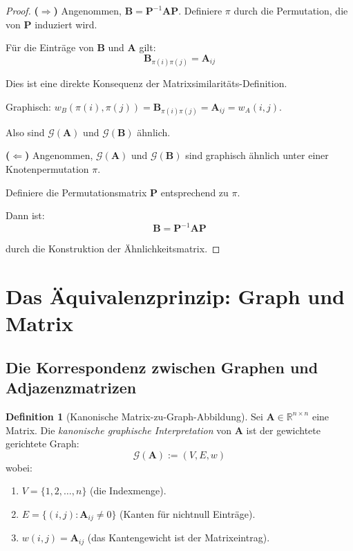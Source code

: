 \documentclass[12pt, a4paper]{article}
\theoremstyle{definition}
\newtheorem{definition}[theorem]{Definition}
\theoremstyle{remark}
\newcommand{\R}{\mathbb{R}}
\newcommand{\vA}{\bm{A}}
\newcommand{\vB}{\bm{B}}
\newcommand{\vP}{\bm{P}}
\newcommand{\Graph}{\mathcal{G}}
\begin{document}
\begin{proof}
\textbf{($\Rightarrow$)} Angenommen, $\vB = \vP^{-1} \vA \vP$. Definiere $\pi$ durch die Permutation, die von $\vP$ induziert wird.

Für die Einträge von $\vB$ und $\vA$ gilt:
\[
  \vB_{\pi(i)\pi(j)} = \vA_{ij}
\]

Dies ist eine direkte Konsequenz der Matrixsimilaritäts-Definition.

Graphisch: $w_B(\pi(i), \pi(j)) = \vB_{\pi(i)\pi(j)} = \vA_{ij} = w_A(i, j)$.

Also sind $\Graph(\vA)$ und $\Graph(\vB)$ ähnlich.

\textbf{($\Leftarrow$)} Angenommen, $\Graph(\vA)$ und $\Graph(\vB)$ sind graphisch ähnlich unter einer Knotenpermutation $\pi$.

Definiere die Permutationsmatrix $\vP$ entsprechend zu $\pi$.

Dann ist:
\[
  \vB = \vP^{-1} \vA \vP
\]

durch die Konstruktion der Ähnlichkeitsmatrix.
\end{proof}

\section{Das Äquivalenzprinzip: Graph und Matrix}
\label{sec:aequivalenzprinzip}

\subsection{Die Korrespondenz zwischen Graphen und Adjazenzmatrizen}
\label{subsec:korrespondenz}

\begin{definition}[Kanonische Matrix-zu-Graph-Abbildung]
\label{def:kanonische_abbildung}
Sei $\vA \in \R^{n \times n}$ eine Matrix. Die \emph{kanonische graphische Interpretation} von $\vA$ ist der gewichtete gerichtete Graph:
\[
  \Graph(\vA) := (V, E, w)
\]
wobei:
\begin{enumerate}[label=(\alph*)]
  \item $V = \{1, 2, \ldots, n\}$ (die Indexmenge).
  \item $E = \{(i, j) : \vA_{ij} \neq 0\}$ (Kanten für nichtnull Einträge).
  \item $w(i, j) = \vA_{ij}$ (das Kantengewicht ist der Matrixeintrag).
\end{enumerate}
\end{definition}
\end{document}
